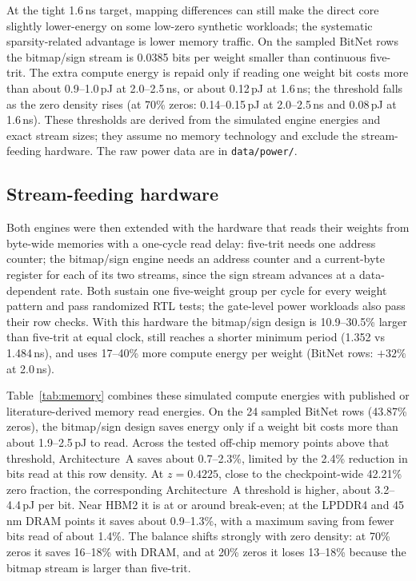 \documentclass[11pt]{article}
\begin{document}
At the tight 1.6\,ns target, mapping differences can still make the direct core slightly lower-energy on some low-zero synthetic workloads; the systematic sparsity-related advantage is lower memory traffic. On the
sampled BitNet rows the bitmap/sign stream is 0.0385 bits per weight smaller
than continuous five-trit. The extra compute energy is repaid only if
reading one weight bit costs more than about 0.9--1.0\,pJ at 2.0--2.5\,ns,
or about 0.12\,pJ at 1.6\,ns; the threshold falls as the zero density rises
(at 70\% zeros: 0.14--0.15\,pJ at 2.0--2.5\,ns and 0.08\,pJ at 1.6\,ns). These thresholds are derived from the
simulated engine energies and exact stream sizes; they assume no memory
technology and exclude the stream-feeding hardware. The raw power data are in \texttt{data/power/}.

\subsection{Stream-feeding hardware}

Both engines were then extended with the hardware that reads their weights
from byte-wide memories with a one-cycle read delay: five-trit needs one
address counter; the bitmap/sign engine needs an address counter and a
current-byte register for each of its two streams, since the sign stream
advances at a data-dependent rate. Both sustain one five-weight group per
cycle for every weight pattern and pass randomized RTL tests; the gate-level
power workloads also pass their row checks. With this hardware the bitmap/sign design is 10.9--30.5\% larger than
five-trit at equal clock, still reaches a shorter minimum period (1.352 vs
1.484\,ns), and uses 17--40\% more compute energy per weight (BitNet rows:
$+32\%$ at 2.0\,ns).

Table~\ref{tab:memory} combines these simulated compute energies with
published or literature-derived memory read energies. On the 24 sampled BitNet rows (43.87\% zeros), the bitmap/sign
design saves energy only if a weight bit costs more than about 1.9--2.5\,pJ
to read. Across the tested off-chip memory points above that threshold,
Architecture~A saves about 0.7--2.3\%, limited by the 2.4\% reduction in
bits read at this row density. At $z=0.4225$, close to the checkpoint-wide 42.21\%
zero fraction, the corresponding Architecture~A threshold is higher, about
3.2--4.4\,pJ per bit. Near HBM2 it is at or around break-even; at the
LPDDR4 and 45\,nm DRAM points it saves about 0.9--1.3\%, with a maximum saving from fewer bits read of about 1.4\%. The balance shifts strongly with
zero density: at 70\% zeros it saves 16--18\% with DRAM, and at 20\% zeros
it loses 13--18\% because the bitmap stream is larger than five-trit.
\end{document}
